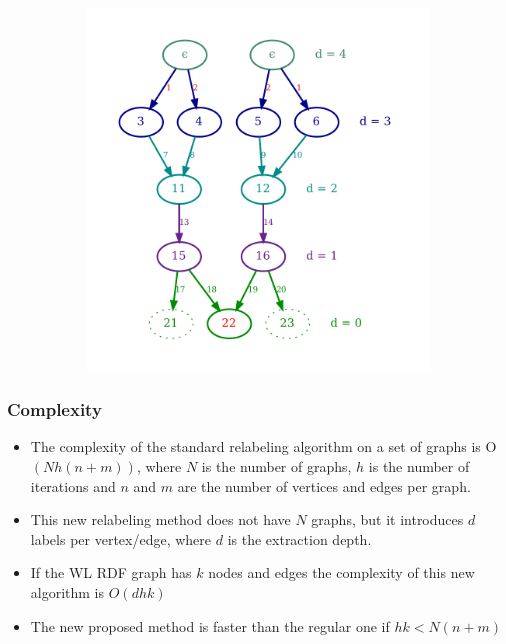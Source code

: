 \documentclass{beamer}
\begin{document}
\begin{frame}
\begin{figure}
\begin{subfigure}{.5\textwidth}
    \includegraphics[width=0.9\linewidth]{img/07-relabeled_vertical}
\end{subfigure}
\end{figure}

\end{frame}
\endgroup

\begin{frame}
\frametitle{Complexity}

\begin{itemize}
\item
The complexity of the standard relabeling algorithm on a set of graphs is O$(Nh(n + m))$, where $N$ is the number of graphs, $h$ is the number of iterations and $n$ and $m$ are the number of vertices and edges per graph.
\item
This new relabeling method does not have $N$ graphs, but it introduces $d$ labels per vertex/edge, where $d$ is the extraction depth.
\item
If the WL RDF graph has $k$ nodes and edges the complexity of this new algorithm is $O(dhk)$
\item
The new proposed method is faster than the regular one if $hk < N(n+m)$
\end{itemize}

\end{frame}

\end{document}
